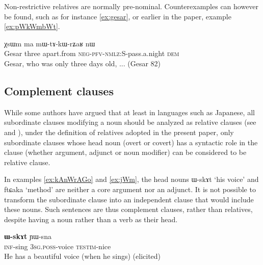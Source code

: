 \documentclass[oldfontcommands,oneside,a4paper,11pt]{article}
\newcommand{\ipa}[1]{{\phon #1}} %
\newcommand{\topic}{\textsc{dem}}
\begin{document}
Non-restrictive relatives are normally pre-nominal. Counterexamples can however be found, such as  for instance \ref{ex:gesar}, or earlier in the paper, example \ref{ex:pWkWmbWt}.

\begin{exe}
   \ex  \label{ex:gesar}
\gll  \ipa{ʁlaŋsaŋtɕʰin}  	\ipa{χsɯm}  	\ipa{ma}  	\ipa{mɯ-tɤ-kɯ-rʑaʁ}  	\ipa{nɯ}     	\\
  Gesar three apart.from \textsc{neg-pfv-nmlz:S}-pass.a.night \topic{}   \\
 \glt  Gesar, who was only three days old, ... (Gesar 82)
   \end{exe} 



%




\subsection{Complement clauses} \label{sec:non.relative}
While some authors have argued that at least in languages such as Japanese, all subordinate clauses modifying a noun should be analyzed as relative clauses (see \citet{matsumoto88adnominal} and \citet{comrie98relatives.rethinking}), under the definition of relatives adopted in the present paper, only subordinate clauses whose head noun (overt or covert) has a syntactic role in the clause (whether argument, adjunct or noun modifier) can be considered to be relative clause.




In examples \ref{ex:kAnWrAGo} and \ref{ex:jWm}, the head nouns \ipa{ɯ-skɤt} `his voice' and  \ipa{ftɕaka} `method' are neither a core argument nor an adjunct. It is not possible to transform the subordinate clause into an independent clause that would include these nouns. Such sentences are thus complement clauses, rather than relatives, despite having a noun rather than a verb as their head.

\begin{exe}
   \ex  \label{ex:kAnWrAGo}
\gll   
[\ipa{kɤ-nɯrɤɣo}]  \textbf{	\ipa{ɯ-skɤt}} 	\ipa{ɲɯ-sna}  \\
\textsc{inf}-sing \textsc{3sg.poss}-voice \textsc{testim}-nice \\
\glt He has a beautiful voice (when he sings) (elicited)
   \end{exe}
\end{document}
